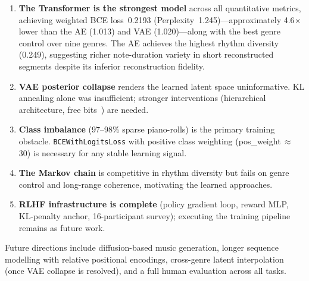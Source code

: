 \documentclass[letterpaper]{article}
\begin{document}
\begin{enumerate}
  \item \textbf{The Transformer is the strongest model} across all
        quantitative metrics, achieving weighted BCE loss~0.2193
        (Perplexity~1.245)---approximately 4.6$\times$ lower than the AE
        (1.013) and VAE (1.020)---along with the best genre control over
        nine genres.  The AE achieves the highest rhythm diversity (0.249),
        suggesting richer note-duration variety in short reconstructed
        segments despite its inferior reconstruction fidelity.
  \item \textbf{VAE posterior collapse} renders the learned latent space
        uninformative.  KL annealing alone was insufficient; stronger
        interventions (hierarchical architecture, free
        bits~\cite{roberts2018musicvae}) are needed.
  \item \textbf{Class imbalance} (97--98\% sparse piano-rolls) is the
        primary training obstacle.  \texttt{BCEWithLogitsLoss} with
        positive class weighting (pos\_weight\,$\approx$\,30) is
        necessary for any stable learning signal.
  \item \textbf{The Markov chain} is competitive in rhythm diversity but
        fails on genre control and long-range coherence, motivating
        the learned approaches.
  \item \textbf{RLHF infrastructure is complete} (policy gradient loop,
        reward MLP, KL-penalty anchor, 16-participant survey); executing
        the training pipeline remains as future work.
\end{enumerate}

Future directions include diffusion-based music generation, longer
sequence modelling with relative positional encodings, cross-genre latent
interpolation (once VAE collapse is resolved), and a full human evaluation
across all tasks.



\end{document}
